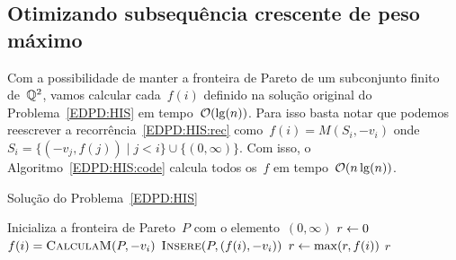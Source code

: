 \subsection{Otimizando subsequência crescente de peso máximo}

Com a possibilidade de manter a fronteira de Pareto de um subconjunto finito de~$\mathbb{Q}^2$, vamos calcular cada~$f(i)$ definido na solução original do Problema~\ref{EDPD:HIS} em tempo~$\mathcal{O}(\lg(n))$. Para isso basta notar que podemos reescrever a recorrência~\ref{EDPD:HIS:rec} como~$f(i) = M(S_i,-v_i)$ onde~$S_i = \{(-v_j,f(j)) \mid j < i\} \cup \{(0,\infty)\}$. Com isso, o Algoritmo~\ref{EDPD:HIS:code} calcula todos os~$f$ em tempo~$\mathcal{O}(n\lg(n))$.

\begin{algorithm}[h]
\caption{Solução do Problema~\ref{EDPD:HIS}}
\label{EDPD:HIS:code}
\begin{algorithmic}[1]
    \State Inicializa a fronteira de Pareto~$P$ com o elemento~$(0,\infty)$
    \State $r \leftarrow 0$
        \State $f(i) = \textsc{CalculaM}(P,-v_i)$
        \State $\textsc{Insere}(P,(f(i),-v_i))$
        \State $r \leftarrow \max(r,f(i))$
    \EndFor
    \State \Return $r$
\EndFunction
\end{algorithmic}
\end{algorithm}
